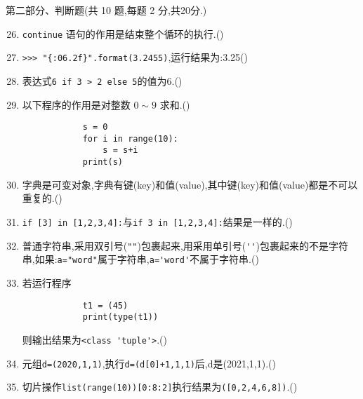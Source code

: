 \documentclass[11pt]{ctexart}
\begin{document}
    {\noindent\heiti 第二部分、判断题(共 10 题,每题 2 分,共20分.)}
    \begin{enumerate}
        \setcounter{enumi}{25}
        \item \lstinline!continue! 语句的作用是结束整个循环的执行.(\qquad)

        \item \lstinline!>>> "{:06.2f}".format(3.2455)!,运行结果为:3.25(\qquad)
        
        \item 表达式\lstinline!6 if 3 > 2 else 5!的值为6.(\qquad)
  
        \item 以下程序的作用是对整数 $0\sim 9$ 求和.(\qquad)
        \begin{lstlisting}
            s = 0
            for i in range(10):
                s = s+i
            print(s)
        \end{lstlisting}
        
        \item 字典是可变对象,字典有键(key)和值(value),其中键(key)和值(value)都是不可以重复的.(\qquad)
        
        \item \lstinline!if [3] in [1,2,3,4]:!与\lstinline!if 3 in [1,2,3,4]:!结果是一样的.(\qquad)
        
        \item 普通字符串,采用双引号(\lstinline!""!)包裹起来,用采用单引号(\lstinline!''!)包裹起来的不是字符串,如果:\lstinline!a="word"!属于字符串,\lstinline!a='word'!不属于字符串.(\qquad)
        
        \item 若运行程序
        \begin{lstlisting}
            t1 = (45)
            print(type(t1))
        \end{lstlisting}
        则输出结果为\lstinline!<class 'tuple'>!.(\qquad)
        
        \item 元组\lstinline!d=(2020,1,1)!,执行\lstinline!d=(d[0]+1,1,1)!后,d是(2021,1,1).(\qquad)
        
        \item 切片操作\lstinline!list(range(10))[0:8:2]!执行结果为\lstinline!([0,2,4,6,8])!.(\qquad)
    \end{enumerate}
\end{document}
